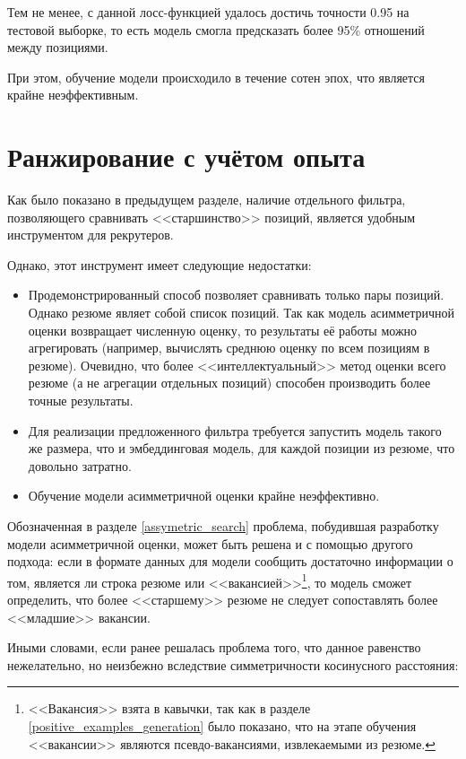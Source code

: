 \documentclass[14pt]{mmcs_article}
\begin{document}
Тем не менее, с данной лосс-функцией удалось достичь точности 0.95 на тестовой выборке, то есть модель смогла предсказать более 95\% отношений между позициями.

При этом, обучение модели происходило в течение сотен эпох, что является крайне неэффективным.


\newpage
\section{Ранжирование с учётом опыта}\label{experience_ranking}

Как было показано в предыдущем разделе, наличие отдельного фильтра, позволяющего сравнивать <<старшинство>> позиций, является удобным инструментом для рекрутеров.

Однако, этот инструмент имеет следующие недостатки:

\begin{itemize}
  \item Продемонстрированный способ позволяет сравнивать только пары позиций. Однако резюме являет собой список позиций. Так как модель асимметричной оценки возвращает численную оценку, то результаты её работы можно агрегировать (например, вычислять среднюю оценку по всем позициям в резюме). Очевидно, что более <<интеллектуальный>> метод оценки всего резюме (а не агрегации отдельных позиций) способен производить более точные результаты.
  \item Для реализации предложенного фильтра требуется запустить модель такого же размера, что и эмбеддинговая модель, для каждой позиции из резюме, что довольно затратно.
  \item Обучение модели асимметричной оценки крайне неэффективно.
\end{itemize}

Обозначенная в разделе \ref{assymetric_search} проблема, побудившая разработку модели асимметричной оценки, может быть решена и с помощью другого подхода: если в формате данных для модели сообщить достаточно информации о том, является ли строка резюме или <<вакансией>>\footnote{<<Вакансия>> взята в кавычки, так как в разделе \ref{positive_examples_generation} было показано, что на этапе обучения <<вакансии>> являются псевдо-вакансиями, извлекаемыми из резюме.}, то модель сможет определить, что более <<старшему>> резюме не следует сопоставлять более <<младшие>> вакансии.

Иными словами, если ранее решалась проблема того, что данное равенство нежелательно, но неизбежно вследствие симметричности косинусного расстояния:
\end{document}
